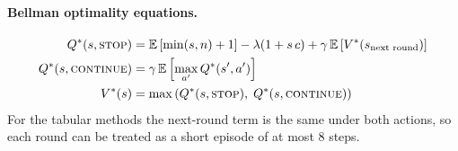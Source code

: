 \paragraph{Bellman optimality equations.}
\begin{align}
Q^*(s,\textsc{stop}) &= \mathbb{E}\left[\min(s,n)+1\right] - \lambda(1+s\,c) + \gamma\,\mathbb{E}\left[V^*(s_{\text{next round}})\right] \\
Q^*(s,\textsc{continue}) &= \gamma\,\mathbb{E}\left[\max_{a'} Q^*(s',a')\right] \\
V^*(s) &= \max\left(Q^*(s,\textsc{stop}),\; Q^*(s,\textsc{continue})\right)
\end{align}
For the tabular methods the next-round term is the same under both actions, so each round can be treated as a short episode of at most 8 steps.
